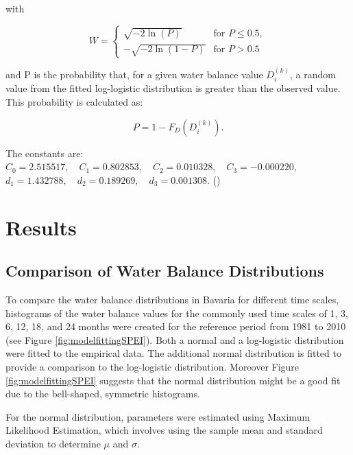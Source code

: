 \documentclass[
]{krantz}
\begin{document}
with

\begin{equation}
W = \begin{cases}
\sqrt{-2\ln(P)} & \text{for } P \le 0.5, \\
-\sqrt{-2\ln(1-P)} & \text{for } P > 0.5
\end{cases}
\end{equation}

and P is the probability that, for a given water balance value \(D^{(k)}_i\), a random value from the fitted log-logistic distribution is greater than the observed value. This probability is calculated as:

\begin{equation}
P = 1 - F_D(D^{(k)}_i).
\end{equation}

The constants are:
\(C_0 = 2.515517, \quad C_1 = 0.802853, \quad C_2 = 0.010328, \quad C_3 = -0.000220,\) \(d_1 = 1.432788, \quad d_2 = 0.189269, \quad d_3 = 0.001308\). (\citet{vicente})

\section{Results}\label{results}

\subsection{Comparison of Water Balance Distributions}\label{comparison-of-water-balance-distributions}

To compare the water balance distributions in Bavaria for different time scales, histograms of the water balance values for the commonly used time scales of 1, 3, 6, 12, 18, and 24 months were created for the reference period from 1981 to 2010 (see Figure \ref{fig:modelfittingSPEI}). Both a normal and a log-logistic distribution were fitted to the empirical data. The additional normal distribution is fitted to provide a comparison to the log-logistic distribution. Moreover Figure \ref{fig:modelfittingSPEI} suggests that the normal distribution might be a good fit due to the bell-shaped, symmetric histograms.

For the normal distribution, parameters were estimated using Maximum Likelihood Estimation, which involves using the sample mean and standard deviation to determine \(\mu\) and \(\sigma\).
\end{document}
